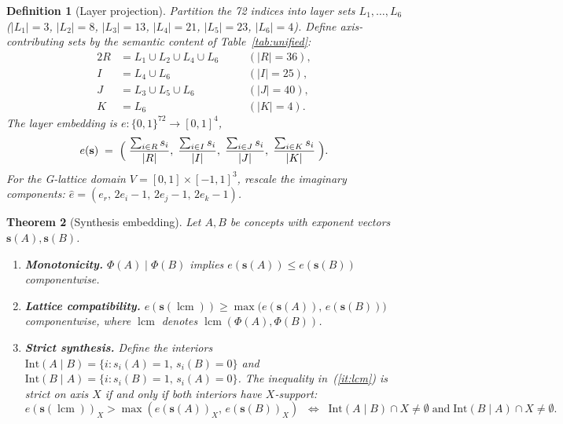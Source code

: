 \documentclass[11pt,a4paper]{article}
\newtheorem{theorem}{Theorem}
\newtheorem{definition}[theorem]{Definition}
\begin{document}
\begin{definition}[Layer projection]
\label{def:layer_proj}
Partition the 72 indices into layer sets
$L_1,\ldots,L_6$ ($|L_1|=3$, $|L_2|=8$, $|L_3|=13$, $|L_4|=21$,
$|L_5|=23$, $|L_6|=4$). Define axis-contributing sets by the semantic
content of Table~\ref{tab:unified}:
\begin{alignat*}{2}
  R &= L_1\cup L_2\cup L_4\cup L_6 &\quad& (|R|=36),\\
  I &= L_4\cup L_6 &\quad& (|I|=25),\\
  J &= L_3\cup L_5\cup L_6 &\quad& (|J|=40),\\
  K &= L_6 &\quad& (|K|=4).
\end{alignat*}
The \emph{layer embedding} is
$e\colon\{0,1\}^{72}\to[0,1]^4$,
\[
  e(\mathbf{s}) \;=\;
  \Bigl(\;
    \frac{\sum_{i\in R}s_i}{|R|},\;
    \frac{\sum_{i\in I}s_i}{|I|},\;
    \frac{\sum_{i\in J}s_i}{|J|},\;
    \frac{\sum_{i\in K}s_i}{|K|}
  \;\Bigr).
\]
For the G-lattice domain $V=[0,1]\times[-1,1]^3$, rescale the
imaginary components: $\hat{e}=(e_r,\,2e_i-1,\,2e_j-1,\,2e_k-1)$.
\end{definition}

\begin{theorem}[Synthesis embedding]
\label{thm:embedding}
Let $A,B$ be concepts with exponent vectors $\mathbf{s}(A),\mathbf{s}(B)$.
\begin{enumerate}[nosep]
\item\label{it:mono} \textbf{Monotonicity.}
  $\Phi(A)\mid\Phi(B)$ implies
  $e(\mathbf{s}(A))\leq e(\mathbf{s}(B))$ componentwise.
\item\label{it:lcm} \textbf{Lattice compatibility.}
  $e(\mathbf{s}(\operatorname{lcm}))\geq
   \max\!\bigl(e(\mathbf{s}(A)),\,e(\mathbf{s}(B))\bigr)$
  componentwise, where $\operatorname{lcm}$
  denotes $\operatorname{lcm}(\Phi(A),\Phi(B))$.
\item\label{it:strict} \textbf{Strict synthesis.}
  Define the \emph{interiors}
  $\mathrm{Int}(A\!\mid\! B)=\{i:s_i(A)=1,\,s_i(B)=0\}$ and
  $\mathrm{Int}(B\!\mid\! A)=\{i:s_i(B)=1,\,s_i(A)=0\}$.
  The inequality in~(\ref{it:lcm}) is strict on axis $X$ if and
  only if both interiors have $X$-support:
  \[
    e(\mathbf{s}(\operatorname{lcm}))_X
    > \max(e(\mathbf{s}(A))_X,\,e(\mathbf{s}(B))_X)
    \;\;\Longleftrightarrow\;\;
    \mathrm{Int}(A\!\mid\! B)\cap X\neq\emptyset
    \;\text{and}\;
    \mathrm{Int}(B\!\mid\! A)\cap X\neq\emptyset.
  \]
\end{enumerate}
\end{theorem}
\end{document}
